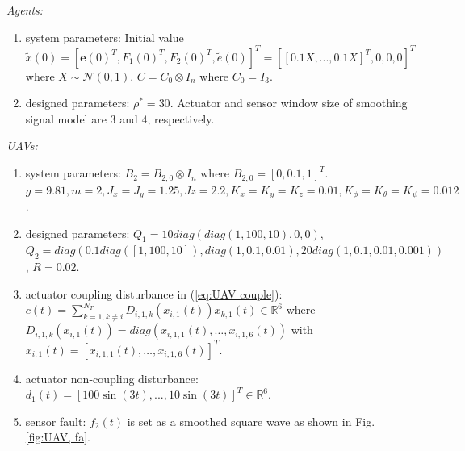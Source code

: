 \documentclass{ieeeaccess}
\begin{document}
\textit{Agents:}\begin{enumerate}
    \item system parameters:
    Initial value $\tilde{x}(0) = [\pmb{e}(0)^T, F_1(0)^T\mathbin{,} F_2(0)^T, \tilde{e}(0)]^T = [[0.1X, ..., 0.1X]^T, 0, 0, 0]^T$ where $X \sim \mathcal{N}(0, 1)$. $C = C_0 \otimes I_n$ where $C_0 = I_3$.
    \item designed parameters: $\rho^*=30$. Actuator and sensor window size of smoothing signal model are $3$ and $4$, respectively.
\end{enumerate}

\textit{UAVs:}\begin{enumerate}
    \item system parameters:
    $B_2=B_{2,0}\otimes I_n$ where $B_{2,0} = [0, 0.1, 1]^T$.
    $g = 9.81, m = 2,
    J_x = J_y = 1.25, Jz = 2.2,
    K_x = K_y = K_z = 0.01,
    K_\phi = K_\theta = K_\psi = 0.012$.

    \item designed parameters: 
    $Q_1 = 10diag(diag(1,100,10)\mathbin{,} 0\mathbin{,} 0)$, 
    $Q_2 = diag(0.1diag([1\mathbin{,} 100\mathbin{,} 10]), diag(1,0.1\mathbin{,} 0.01), 20diag(1,0.1,0.01 ,0.001))$, 
    $R = 0.02$.

    \item actuator coupling disturbance in (\ref{eq:UAV couple}):
    \\$c(t) = \sum_{k = 1, k \neq i}^{N_T}D_{i, 1, k}(x_{i, 1}(t))x_{k, 1}(t)\in\mathbb{R}^6$ where $D_{i, 1, k}(x_{i, 1}(t)) = diag(x_{i, 1, 1}(t)\mathbin{,}\dots\mathbin{,}x_{i, 1, 6}(t))$ with $x_{i, 1}(t) = [x_{i, 1, 1}(t)\mathbin{,}\dots\mathbin{,}x_{i, 1, 6}(t)]^T$.
    \item actuator non-coupling disturbance:
    \\ $d_1(t) = [100\sin(3t)\mathbin{,} ...\mathbin{,} 10\sin(3t)]^T\in\mathbb{R}^6$.
    \item sensor fault: $f_2(t)$ is set as a smoothed square wave as shown in Fig. \ref{fig:UAV, fa}.
\end{enumerate}
\end{document}
